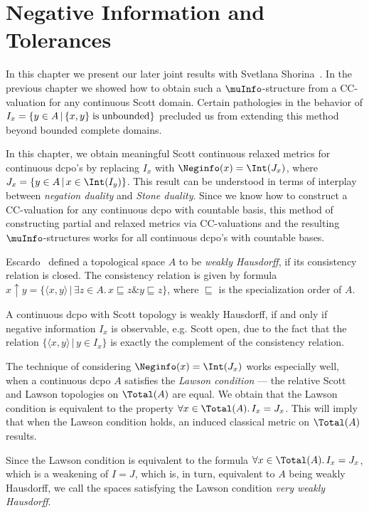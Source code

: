 \chapter{Negative Information and Tolerances} \label{chap:Neginfo}

In this chapter we present our later joint results with
Svetlana Shorina~\cite{BukatinShorina3,BukatinShorina4}.
In the previous chapter 
we showed how to obtain such a $\muInfo$-structure
from a CC-valuation for any continuous Scott domain.
Certain pathologies in the behavior of
$I_x=\{y\in A\,|\, \{x,y\} {\rm \; is \;
unbounded}\}$
precluded us from extending this
method beyond bounded complete domains.

In this chapter, we obtain meaningful Scott continuous relaxed metrics
for continuous dcpo's by replacing $I_x$ with
$\Neginfo(x) = \Int (J_x)$,
where $J_x = \{y\in A\,|\, x \in \Int(I_y)\}$.
This result can be understood
in terms of interplay between {\em negation duality} and
{\em Stone duality}.
Since we know how to construct a CC-valuation for any
continuous dcpo with countable basis, this method of
constructing partial and relaxed metrics via
CC-valuations and the resulting $\muInfo$-structures
works for all continuous dcpo's with countable bases.

Escardo~\cite{Escardo, Smyth2} defined a topological space $A$ to be
{\em weakly Hausdorff}, if its consistency relation is closed.
The consistency relation is given by formula
$x \uparrow y = \{\langle x, y \rangle\,|\, \exists z \in A.\, x
\sqsubseteq z \& y \sqsubseteq z\}$, where $\sqsubseteq$ is the
specialization order of $A$.

A continuous dcpo with Scott topology is
weakly Hausdorff, if and only if
negative information $I_x$ is observable, e.g. Scott open,
due to the fact that the relation
$\{\langle x, y \rangle\,|\, y \in I_x\}$ is exactly the complement of
the consistency relation.

The technique of considering $\Neginfo(x) = \Int (J_x)$ works especially well,
when a continuous dcpo $A$ satisfies the {\em Lawson condition} ---
the relative Scott and Lawson topologies on $\Total(A)$ are equal.
We obtain that the Lawson condition is equivalent to the
property $\forall x \in \Total(A).\, I_x = J_x$. This will imply
that when the Lawson condition holds,
an induced classical metric on $\Total(A)$
results.

Since the Lawson condition is
equivalent to the formula $\forall x \in \Total(A).\, I_x = J_x$,
which is a weakening of $I=J$, which is, in turn, equivalent to
$A$ being weakly Hausdorff, we call the spaces satisfying the Lawson
condition {\em very weakly Hausdorff}.

